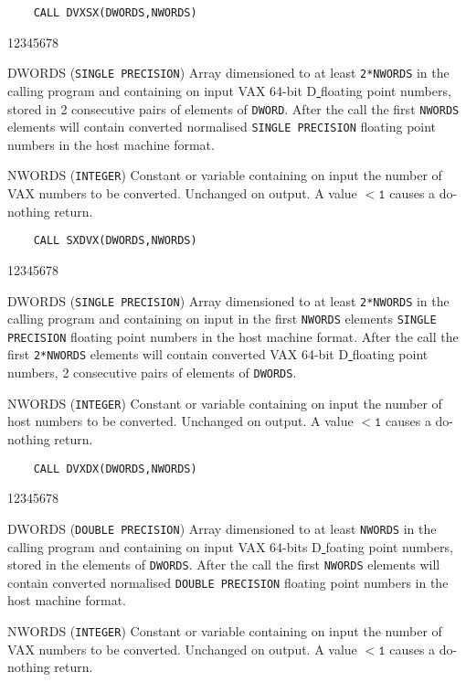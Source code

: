 \begin{verbatim}
    CALL DVXSX(DWORDS,NWORDS)
\end{verbatim}
\begin{DLtt}{12345678}
\item[DWORDS] ({\tt SINGLE PRECISION}) Array dimensioned to at least
{\tt 2*NWORDS} in the calling program and containing on input VAX 64-bit
D\underline{ }floating point numbers, stored in 2 consecutive pairs of
elements of {\tt DWORD}. After the call the first {\tt NWORDS} elements
will contain converted normalised {\tt SINGLE PRECISION} floating point
numbers in the host machine format.
\item[NWORDS] ({\tt INTEGER}) Constant or variable containing on input
the number of VAX numbers to be converted. Unchanged on output. A
value $\mathtt{< 1}$ causes a do-nothing return.
\end{DLtt}
\newpage
\begin{verbatim}
    CALL SXDVX(DWORDS,NWORDS)
\end{verbatim}
\begin{DLtt}{12345678}
\item[DWORDS]  ({\tt SINGLE PRECISION}) Array dimensioned to at
least {\tt 2*NWORDS} in the calling program and containing on input in
the first {\tt NWORDS} elements {\tt SINGLE PRECISION} floating point
numbers in the host machine format. After the call the first
{\tt 2*NWORDS} elements will contain converted VAX 64-bit
D\underline{ }floating point numbers, 2 consecutive pairs of elements of
{\tt DWORDS}.
\item[NWORDS] ({\tt INTEGER}) Constant or variable containing on input
the number of host numbers to be converted. Unchanged on output. A
value $\mathtt{< 1}$ causes a do-nothing return.
\end{DLtt}
\begin{verbatim}
    CALL DVXDX(DWORDS,NWORDS)
\end{verbatim}
\begin{DLtt}{12345678}
\item[DWORDS]  ({\tt DOUBLE PRECISION}) Array dimensioned to at least
{\tt NWORDS} in the calling program and containing on input VAX 64-bits
D\underline{ }foating point numbers, stored in the elements of
{\tt DWORDS}. After the call the first {\tt NWORDS} elements will contain
converted normalised {\tt DOUBLE PRECISION} floating point numbers in the
host machine format.
\item[NWORDS] ({\tt INTEGER}) Constant or variable containing on input
the number of VAX numbers to be converted. Unchanged on output. A
value $\mathtt{< 1}$ causes a do-nothing return.
\end{DLtt}
